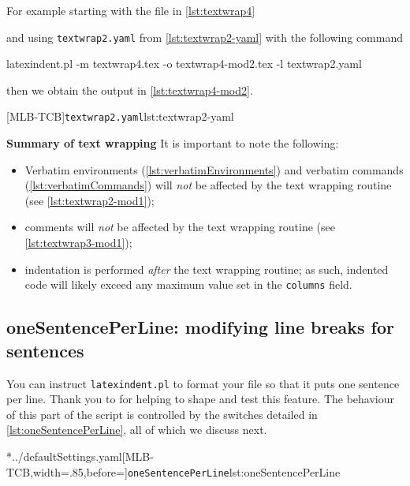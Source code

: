 	For example starting with the file in \cref{lst:textwrap4} 

	 and using \texttt{textwrap2.yaml} from \cref{lst:textwrap2-yaml} with the following command \begin{commandshell}
latexindent.pl -m textwrap4.tex -o textwrap4-mod2.tex -l textwrap2.yaml
\end{commandshell} then we obtain the output in \cref{lst:textwrap4-mod2}.

	\begin{minipage}{.45\linewidth}
	\end{minipage}
	\hfill
	\begin{minipage}{.45\linewidth}
		[MLB-TCB]{\texttt{textwrap2.yaml}}{lst:textwrap2-yaml}
	\end{minipage}

	\textbf{Summary of text wrapping}
	It is important to note the following: \begin{itemize} \item Verbatim environments (\vref{lst:verbatimEnvironments}) and verbatim commands (\vref{lst:verbatimCommands}) will \emph{not} be affected by the text wrapping routine (see \vref{lst:textwrap2-mod1});
		\item comments will \emph{not} be affected by the text wrapping routine (see \vref{lst:textwrap3-mod1});
		\item indentation is performed \emph{after} the text wrapping routine; as such, indented code will likely exceed any maximum value set in the \texttt{columns} field.
	\end{itemize}

\subsection{oneSentencePerLine: modifying line breaks for sentences}
	\label{sec:onesentenceperline}
	You can instruct \texttt{latexindent.pl} to format%
	 your file so that it puts one sentence per line.
	Thank you to \cite{mlep} for helping to shape and test this feature.
	The behaviour of this part of the script is controlled by the switches detailed in \cref{lst:oneSentencePerLine}, all of which we discuss next.

	\cmhlistingsfromfile[style=oneSentencePerLine]*{../defaultSettings.yaml}[MLB-TCB,width=.85\linewidth,before=\centering]{\texttt{oneSentencePerLine}}{lst:oneSentencePerLine}

